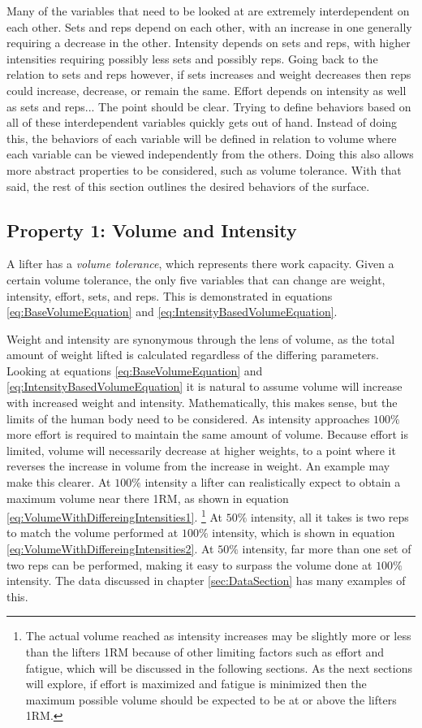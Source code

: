 Many of the variables that need to be looked at are extremely interdependent on each other. Sets and reps depend on each other, with an increase in one generally requiring a decrease in the other. Intensity depends on sets and reps, with higher intensities requiring possibly less sets and possibly reps. Going back to the relation to sets and reps however, if sets increases and weight decreases then reps could increase, decrease, or remain the same. Effort depends on intensity as well as sets and reps... The point should be clear. Trying to define behaviors based on all of these interdependent variables quickly gets out of hand. Instead of doing this, the behaviors of each variable will be defined in relation to volume where each variable can be viewed independently from the others. Doing this also allows more abstract properties to be considered, such as volume tolerance. With that said, the rest of this section outlines the desired behaviors of the surface.

\subsection{Property 1: Volume and Intensity}
\label{sec:PotentialSurfaceIntuitiveRelationshipsBetweenVariablesVolumeAndIntensity}

A lifter has a \textit{volume tolerance}, which represents there work capacity. Given a certain volume tolerance, the only five variables that can change are weight, intensity, effort, sets, and reps. This is demonstrated in equations \ref{eq:BaseVolumeEquation} and \ref{eq:IntensityBasedVolumeEquation}.

Weight and intensity are synonymous through the lens of volume, as the total amount of weight lifted is calculated regardless of the differing parameters. Looking at equations \ref{eq:BaseVolumeEquation} and \ref{eq:IntensityBasedVolumeEquation} it is natural to assume volume will increase with increased weight and intensity. Mathematically, this makes sense, but the limits of the human body need to be considered. As intensity approaches $100\%$ more effort is required to maintain the same amount of volume. Because effort is limited, volume will necessarily decrease at higher weights, to a point where it reverses the increase in volume from the increase in weight. An example may make this clearer. At $100\%$ intensity a lifter can realistically expect to obtain a maximum volume near there 1RM, as shown in equation \ref{eq:VolumeWithDiffereingIntensities1}. \footnote{The actual volume reached as intensity increases may be slightly more or less than the lifters 1RM because of other limiting factors such as effort and fatigue, which will be discussed in the following sections. As the next sections will explore, if effort is maximized and fatigue is minimized then the maximum possible volume should be expected to be at or above the lifters 1RM.} At $50\%$ intensity, all it takes is two reps to match the volume performed at $100\%$ intensity, which is shown in equation \ref{eq:VolumeWithDiffereingIntensities2}. At $50\%$ intensity, far more than one set of two reps can be performed, making it easy to surpass the volume done at $100\%$ intensity. The data discussed in chapter \ref{sec:DataSection} has many examples of this.


